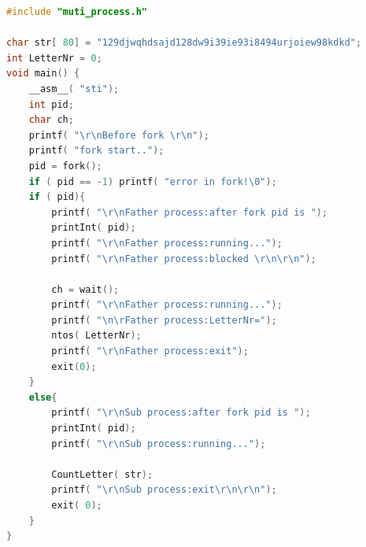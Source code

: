 \documentclass[a4paper]{article}
\begin{document}
{{\begin{lstlisting}[language={C}]
#include "muti_process.h"

char str[ 80] = "129djwqhdsajd128dw9i39ie93i8494urjoiew98kdkd";
int LetterNr = 0;
void main() {
    __asm__( "sti");
    int pid;
    char ch;
    printf( "\r\nBefore fork \r\n");
    printf( "fork start..");
    pid = fork();
    if ( pid == -1) printf( "error in fork!\0");
    if ( pid){
        printf( "\r\nFather process:after fork pid is ");
        printInt( pid);
        printf( "\r\nFather process:running...");
        printf( "\r\nFather process:blocked \r\n\r\n");

        ch = wait();
        printf( "\r\nFather process:running...");
        printf( "\n\rFather process:LetterNr=");
        ntos( LetterNr);
        printf( "\r\nFather process:exit");
        exit(0);
    }
    else{
        printf( "\r\nSub process:after fork pid is ");
        printInt( pid);
        printf( "\r\nSub process:running...");

        CountLetter( str);
        printf( "\r\nSub process:exit\r\n\r\n");
        exit( 0);
    }
}
	\end{lstlisting}
}



}
\end{document}
